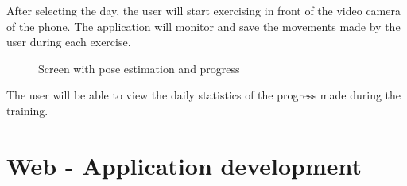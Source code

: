 After selecting the day, the user will start exercising in front of the video camera of the phone.
The application will monitor and save the movements made by the user during each exercise.
\begin{figure}[!htb]
  \centering
  \hfill
    
    \caption{Screen with pose estimation and progress}
\end{figure}
The user will be able to view the daily statistics of the progress made during the training.

\section{Web - Application development}

